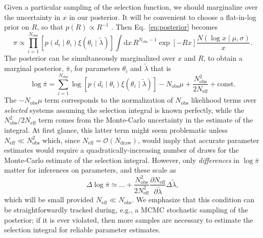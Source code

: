 \documentclass[modern]{aastex62}
\newcommand{\dd}{\mathrm{d}}
\newcommand{\Ndraw}{N_\mathrm{draw}}
\newcommand{\Neff}{N_\mathrm{eff}}
\newcommand{\Nobs}{N_\mathrm{obs}}
\begin{document}
Given a particular sampling of the selection function, we should marginalize
over the uncertainty in $x$ in our posterior.  It will be convenient to choose a
flat-in-log prior on $R$, so that $p(R) \propto R^{-1}$
\citep{Fishbach2018,Mandel2018}.  Then Eq.\ \eqref{eq:posterior} becomes
%
\begin{equation}
  \label{eq:posterior-integrated}
    \pi \propto \prod_{i = 1}^{\Nobs} \left[ p\left( d_i \mid \theta_i \right) \xi\left( \theta_i \mid \tilde{\lambda} \right) \right] \int \dd x \, R^{\Nobs - 1} \exp\left[ -R x \right] \frac{N\left( \log x \mid \mu, \sigma\right)}{x}.
\end{equation}
%
The posterior can be simultaneously marginalized over $x$ and $R$, to obtain a
marginal posterior, $\bar{\pi}$, for parameters $\theta_i$ and $\tilde{\lambda}$
that is
%
\begin{equation}
  \log \bar{\pi} = \sum_{i = 1}^{\Nobs} \log \left[ p\left( d_i \mid \theta_i \right) \xi\left( \theta_i \mid \tilde{\lambda} \right) \right] - \Nobs \mu + \frac{\Nobs^2}{2 \Neff} + \mathrm{const}.
\end{equation}
%
The $-\Nobs\mu$ term corresponds to the normalization of $\Nobs$ likelihood
terms over \emph{selected} systems \citep{Mandel2018} assuming the selection
integral is known perfectly, while the $\Nobs^2/2\Neff$ term comes from the
Monte-Carlo uncertainty in the estimate of the integral.  At first glance, this
latter term might seem problematic unless $\Neff \ll \Nobs^2$ which, since
$\Neff = \mathcal{O}\left( \Ndraw \right)$, would imply that accurate parameter
estimates would require a quadratically-increasing number of draws for the
Monte-Carlo estimate of the selection integral.  However, only
\emph{differences} in $\log \bar{\pi}$ matter for inferences on parameters, and
these scale as
%
\begin{equation}
    \Delta \log \bar{\pi} \simeq \ldots + \frac{\Nobs^2}{2\Neff^2} \frac{\partial \Neff}{\partial \tilde{\lambda}} \Delta \tilde{\lambda},
\end{equation}
%
which will be small provided $\Neff \ll \Nobs$.  We emphasize that this
condition can be straightforwardly tracked during, e.g., a MCMC stochastic
sampling of the posterior; if it is ever violated, then more samples are
necessary to estimate the selection integral for reliable parameter estimates.
\end{document}
